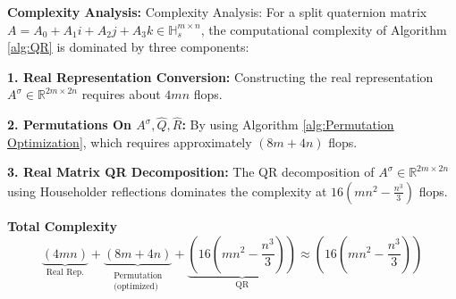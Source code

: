 \documentclass{book}
\theoremstyle{remark}
\begin{document}
\begin{multicols}{2}
\textbf{Complexity Analysis:}
{Complexity Analysis:} For a split quaternion matrix $A = A_0 + A_1i + A_2j + A_3k \in \mathbb{H}_s^{m \times n}$, the computational complexity of Algorithm \ref{alg:QR} is dominated by three components:  

\textbf{1. Real Representation Conversion:}
Constructing the real representation $A^\sigma \in \mathbb{R}^{2m \times 2n}$ requires about $4mn$ flops. 

\textbf{2. Permutations On $A^\sigma, \widehat{Q}, \widehat{R}$:}
By using Algorithm \ref{alg:Permutation Optimization},  which requires approximately  $(8m+4n)$ flops.

\textbf{3. Real Matrix QR Decomposition:}
The QR decomposition of $A^\sigma \in \mathbb{R}^{2m \times 2n}$ using Householder reflections dominates the complexity at $16(mn^2-\frac{n^3}{3})$ flops.

\textbf{Total Complexity}
$$
\underbrace{(4mn)}_{\text{Real Rep.}} + \underbrace{(8m+4n)}_{\substack{\text{Permutation} \\ \text{(optimized)}}} + \underbrace{(16(mn^2-\frac{n^3}{3}))}_{\text{QR}} \approx \boxed{(16(mn^2-\frac{n^3}{3}))}
$$  


\end{multicols}
\end{document}
